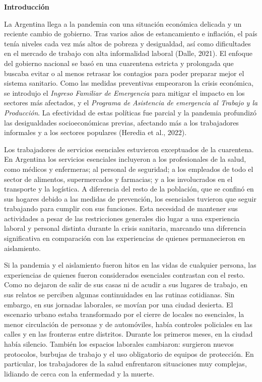 \textbf{Introducción}

La Argentina llega a la pandemia con una situación económica delicada y un reciente cambio de gobierno. Tras varios años de estancamiento e inflación, el país tenía niveles cada vez más altos de pobreza y desigualdad, así como dificultades en el mercado de trabajo con alta informalidad laboral (Dalle, 2021). El enfoque del gobierno nacional se basó en una cuarentena estricta y prolongada que buscaba evitar o al menos retrasar los contagios para poder preparar mejor el sistema sanitario. Como las medidas preventivas empeoraron la crisis económica, se introdujo el \emph{Ingreso Familiar de Emergencia} para mitigar el impacto en los sectores más afectados, y el \emph{Programa de Asistencia de emergencia al Trabajo y la Producción}. La efectividad de estas políticas fue parcial y la pandemia profundizó las desigualdades socioeconómicas previas, afectando más a los trabajadores informales y a los sectores populares (Heredia et al., 2022).

Los trabajadores de servicios esenciales estuvieron exceptuados de la cuarentena. En Argentina los servicios esenciales incluyeron a los profesionales de la salud, como médicos y enfermeras; al personal de seguridad; a los empleados de todo el sector de alimentos, supermercados y farmacias; y a los involucrados en el transporte y la logística. A diferencia del resto de la población, que se confinó en sus hogares debido a las medidas de prevención, los esenciales tuvieron que seguir trabajando para cumplir con sus funciones. Esta necesidad de mantener sus actividades a pesar de las restricciones generales dio lugar a una experiencia laboral y personal distinta durante la crisis sanitaria, marcando una diferencia significativa en comparación con las experiencias de quienes permanecieron en aislamiento.

Si la pandemia y el aislamiento fueron hitos en las vidas de cualquier persona, las experiencias de quienes fueron considerados esenciales contrastan con el resto. Como no dejaron de salir de sus casas ni de acudir a sus lugares de trabajo, en sus relatos se perciben algunas continuidades en las rutinas cotidianas. Sin embargo, en sus jornadas laborales, se movían por una ciudad desierta. El escenario urbano estaba transformado por el cierre de locales no esenciales, la menor circulación de personas y de automóviles, había controles policiales en las calles y en las fronteras entre distritos. Durante los primeros meses, en la ciudad había silencio. También los espacios laborales cambiaron: surgieron nuevos protocolos, burbujas de trabajo y el uso obligatorio de equipos de protección. En particular, los trabajadores de la salud enfrentaron situaciones muy complejas, lidiando de cerca con la enfermedad y la muerte.

